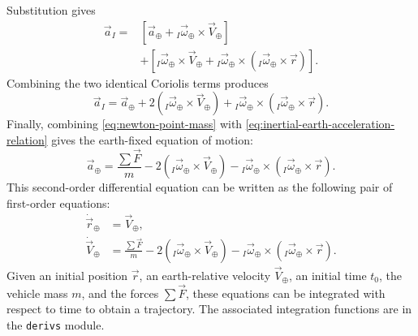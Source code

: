 Substitution gives
\begin{equation}
  \begin{aligned}
  \vec a_I={}&
    \left[
      \vec a_{\oplus}
      +{}_{I}\vec\omega_{\oplus}\times\vec V_{\oplus}
    \right]\\
    &+\left[
      {}_{I}\vec\omega_{\oplus}\times\vec V_{\oplus}
      +{}_{I}\vec\omega_{\oplus}\times
        \left({}_{I}\vec\omega_{\oplus}\times\vec r\right)
    \right].
  \end{aligned}
  \label{eq:inertial-acceleration-grouped}
\end{equation}
Combining the two identical Coriolis terms produces
\begin{equation}
  \vec a_I
  =\vec a_{\oplus}
   +2\left({}_{I}\vec\omega_{\oplus}\times\vec V_{\oplus}\right)
   +{}_{I}\vec\omega_{\oplus}\times
      \left({}_{I}\vec\omega_{\oplus}\times\vec r\right).
  \label{eq:inertial-earth-acceleration-relation}
\end{equation}
Finally, combining \cref{eq:newton-point-mass} with
\cref{eq:inertial-earth-acceleration-relation} gives the earth-fixed equation of
motion:
\begin{equation}
  \vec a_{\oplus}
  =\frac{\sum\vec F}{m}
   -2\left({}_{I}\vec\omega_{\oplus}\times\vec V_{\oplus}\right)
   -{}_{I}\vec\omega_{\oplus}\times
      \left({}_{I}\vec\omega_{\oplus}\times\vec r\right).
  \label{eq:earth-fixed-equation-of-motion}
\end{equation}
This second-order differential equation can be written as the following pair of
first-order equations:
\begin{equation}
  \begin{aligned}
    \dot{\vec r}_{\oplus}&=\vec V_{\oplus},\\[0.3em]
    \dot{\vec V}_{\oplus}
      &=\frac{\sum\vec F}{m}
       -2\left({}_{I}\vec\omega_{\oplus}\times\vec V_{\oplus}\right)
       -{}_{I}\vec\omega_{\oplus}\times
          \left({}_{I}\vec\omega_{\oplus}\times\vec r\right).
  \end{aligned}
  \label{eq:first-order-equations-of-motion}
\end{equation}
Given an initial position $\vec r$, an earth-relative velocity
$\vec V_{\oplus}$, an initial time $t_0$, the vehicle mass $m$, and the forces
$\sum\vec F$, these equations can be integrated with respect to time to obtain a
trajectory. The associated integration functions are in the \texttt{derivs} module.
